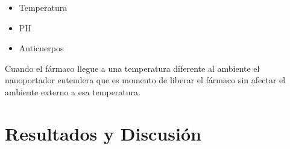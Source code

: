 \documentclass[a4paper,fleqn]{cas-sc}
\begin{document}
\begin{itemize}
  \item Temperatura
  \item PH
  \item Anticuerpos
\end{itemize}

Cuando el fármaco llegue a una temperatura diferente al ambiente el nanoportador entendera que es momento de liberar el fármaco sin afectar el ambiente externo a esa temperatura.



\section{Resultados y Discusión}




%





\end{document}
